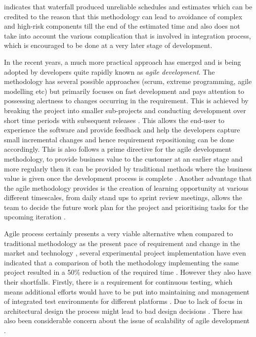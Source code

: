 \documentclass[12pt]{article}
\begin{document}
\cite{larman2004agile} indicates that waterfall produced unreliable schedules and estimates which can be credited to the reason that this methodology can lead to avoidance of complex and high-risk components till the end of the estimated time and also does not take into account the various complication that is involved in integration process, which is encouraged to be done at a very later stage of development. 


In the recent years, a much more practical approach has emerged and is being adopted by developers quite rapidly known as \textit{agile development}. The methodology has several possible approaches (scrum, extreme programming, agile modelling etc) but primarily focuses on fast development and pays attention to possessing alertness to changes occurring in the requirement. This is achieved by breaking the project into smaller sub-projects and conducting development over short time periods with subsequent releases \cite{ruparelia2010software}. This allows the end-user to experience the software and provide feedback and help the developers capture small incremental changes and hence requirement repositioning can be done accordingly. This is also follows a prime directive for the agile development methodology, to provide business value to the customer at an earlier stage and more regularly then it can be provided by traditional methods where the business value is given once the development process is complete \cite{racheva2010we}. Another advantage that the agile methodology provides is the creation of learning opportunity at various different timescales, from daily stand ups to sprint review meetings, allows the team to decide the future work plan for the project and prioritising tasks for the upcoming iteration \cite{cohn2005agile}.


Agile process certainly presents a very viable alternative when compared to traditional methodology as the present pace of requirement and change in the market and technology \cite{alan2003agile}, several experimental project implementation have even indicated that a comparison of both the methodology implementing the same project resulted in a 50\% reduction of the required time  \cite{jim2002whatisa}. However they also have their shortfalls. Firstly, there is a requirement for continuous testing, which means additional efforts would have to be put into maintaining and management of integrated test environments for different platforms \cite{clancy1995standish}. Due to lack of focus in architectural design the process might lead to bad design decisions \cite{larman2004agile}. There has also been considerable concern about the issue of scalability of agile development \cite{petersen2009comparison,sommerville1996software}. 
\end{document}
